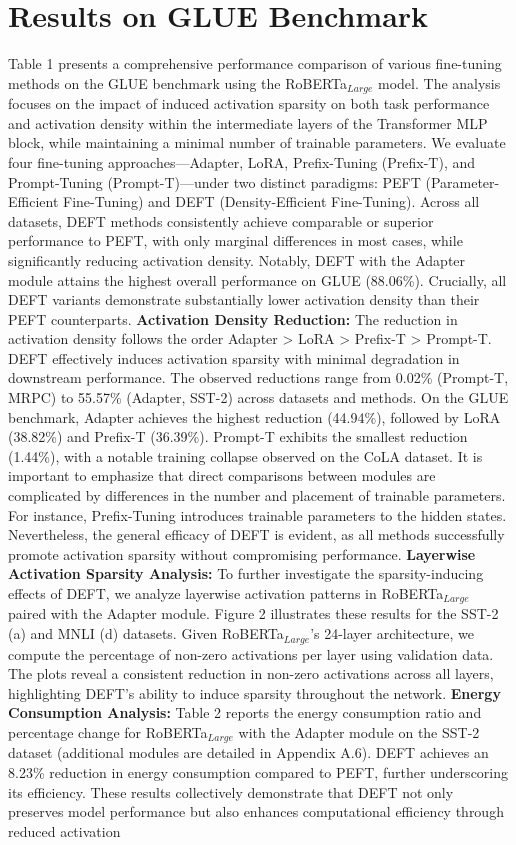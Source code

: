 \documentclass[10pt,twocolumn]{article}
\begin{document}
\section{Results on GLUE Benchmark}

Table 1 presents a comprehensive performance comparison of various fine-tuning methods on the GLUE benchmark using the RoBERTa\(_{Large}\) model. The analysis focuses on the impact of induced activation sparsity on both task performance and activation density within the intermediate layers of the Transformer MLP block, while maintaining a minimal number of trainable parameters. We evaluate four fine-tuning approaches—Adapter, LoRA, Prefix-Tuning (Prefix-T), and Prompt-Tuning (Prompt-T)—under two distinct paradigms: PEFT (Parameter-Efficient Fine-Tuning) and DEFT (Density-Efficient Fine-Tuning). Across all datasets, DEFT methods consistently achieve comparable or superior performance to PEFT, with only marginal differences in most cases, while significantly reducing activation density. Notably, DEFT with the Adapter module attains the highest overall performance on GLUE (88.06\%). Crucially, all DEFT variants demonstrate substantially lower activation density than their PEFT counterparts. \textbf{Activation Density Reduction:} The reduction in activation density follows the order Adapter \textgreater{} LoRA \textgreater{} Prefix-T \textgreater{} Prompt-T. DEFT effectively induces activation sparsity with minimal degradation in downstream performance. The observed reductions range from 0.02\% (Prompt-T, MRPC) to 55.57\% (Adapter, SST-2) across datasets and methods. On the GLUE benchmark, Adapter achieves the highest reduction (44.94\%), followed by LoRA (38.82\%) and Prefix-T (36.39\%). Prompt-T exhibits the smallest reduction (1.44\%), with a notable training collapse observed on the CoLA dataset. It is important to emphasize that direct comparisons between modules are complicated by differences in the number and placement of trainable parameters. For instance, Prefix-Tuning introduces trainable parameters to the hidden states. Nevertheless, the general efficacy of DEFT is evident, as all methods successfully promote activation sparsity without compromising performance. \textbf{Layerwise Activation Sparsity Analysis:} To further investigate the sparsity-inducing effects of DEFT, we analyze layerwise activation patterns in RoBERTa\(_{Large}\) paired with the Adapter module. Figure 2 illustrates these results for the SST-2 (a) and MNLI (d) datasets. Given RoBERTa\(_{Large}\)'s 24-layer architecture, we compute the percentage of non-zero activations per layer using validation data. The plots reveal a consistent reduction in non-zero activations across all layers, highlighting DEFT's ability to induce sparsity throughout the network. \textbf{Energy Consumption Analysis:} Table 2 reports the energy consumption ratio and percentage change for RoBERTa\(_{Large}\) with the Adapter module on the SST-2 dataset (additional modules are detailed in Appendix A.6). DEFT achieves an 8.23\% reduction in energy consumption compared to PEFT, further underscoring its efficiency. These results collectively demonstrate that DEFT not only preserves model performance but also enhances computational efficiency through reduced activation 
\end{document}
